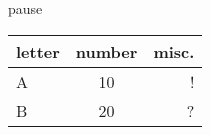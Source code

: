 \documentclass[10pt,compress,
               xcolor={dvipsnames,table}
              ]{beamer}
\begin{document}
\begin{frame}{pause}
\begin{tabular}{l c r}
\hline 
letter  & number & misc. \\
\hline
A & 10 & ! \pause\\
B & 20 & ? \\
\hline
\end{tabular}
\end{frame}
\end{document}
